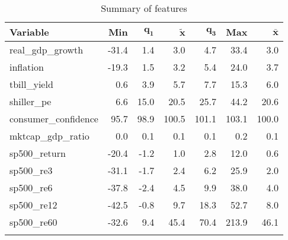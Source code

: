 \begingroup\footnotesize
\begin{longtable}{lrrrrrr}
 \textbf{Variable} & \textbf{Min} & $\mathbf{q_1}$ & $\mathbf{\widetilde{x}}$ & $\mathbf{q_3}$ & \textbf{Max} & $\mathbf{\bar{x}}$ \\ 
  \hline
real\_gdp\_growth & -31.4 &  1.4 &   3.0 &   4.7 &  33.4 &   3.0 \\ 
  inflation & -19.3 &  1.5 &   3.2 &   5.4 &  24.0 &   3.7 \\ 
  tbill\_yield &   0.6 &  3.9 &   5.7 &   7.7 &  15.3 &   6.0 \\ 
  shiller\_pe &   6.6 & 15.0 &  20.5 &  25.7 &  44.2 &  20.6 \\ 
  consumer\_confidence &  95.7 & 98.9 & 100.5 & 101.1 & 103.1 & 100.0 \\ 
  mktcap\_gdp\_ratio &   0.0 &  0.1 &   0.1 &   0.1 &   0.2 &   0.1 \\ 
  sp500\_return & -20.4 & -1.2 &   1.0 &   2.8 &  12.0 &   0.6 \\ 
  sp500\_re3 & -31.1 & -1.7 &   2.4 &   6.2 &  25.9 &   2.0 \\ 
  sp500\_re6 & -37.8 & -2.4 &   4.5 &   9.9 &  38.0 &   4.0 \\ 
  sp500\_re12 & -42.5 & -0.8 &   9.7 &  18.3 &  52.7 &   8.0 \\ 
  sp500\_re60 & -32.6 &  9.4 &  45.4 &  70.4 & 213.9 &  46.1 \\ 
  \hline
\caption{Summary of features} 
\label{tab:features}
\end{longtable}
\endgroup

